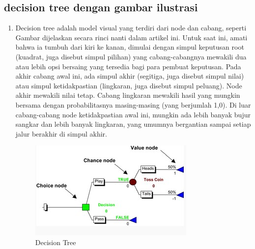 \begin{enumerate}
\begin{enumerate}
\begin{enumerate}
\begin{enumerate}
\begin{enumerate}
\begin{enumerate}
\begin{enumerate}
\begin{enumerate}
\begin{enumerate}
\begin{enumerate}
\begin{enumerate}
\subsection{decision tree dengan gambar ilustrasi}
\begin{enumerate}
\item Decision tree adalah model visual yang terdiri dari node dan cabang, seperti Gambar dijelaskan secara rinci nanti dalam artikel ini. Untuk saat ini, amati bahwa ia tumbuh dari kiri ke kanan, dimulai dengan simpul keputusan root (kuadrat, juga disebut simpul pilihan) yang cabang-cabangnya mewakili dua atau lebih opsi bersaing yang tersedia bagi para pembuat keputusan. Pada akhir cabang awal ini, ada simpul akhir (segitiga, juga disebut simpul nilai) atau simpul ketidakpastian (lingkaran, juga disebut simpul peluang). Node akhir mewakili nilai tetap. Cabang lingkaran mewakili hasil yang mungkin bersama dengan probabilitasnya masing-masing (yang berjumlah 1,0). Di luar cabang-cabang node ketidakpastian awal ini, mungkin ada lebih banyak bujur sangkar dan lebih banyak lingkaran, yang umumnya bergantian sampai setiap jalur berakhir di simpul akhir.
\begin{figure}[ht]
\centering
\includegraphics[scale=0.5]{figures/f6.jpg}
\caption{Decision Tree}
\label{contoh}
\end{figure}


\end{enumerate}
\end{enumerate}
\end{enumerate}
\end{enumerate}
\end{enumerate}
\end{enumerate}
\end{enumerate}
\end{enumerate}
\end{enumerate}
\end{enumerate}
\end{enumerate}
\end{enumerate}
